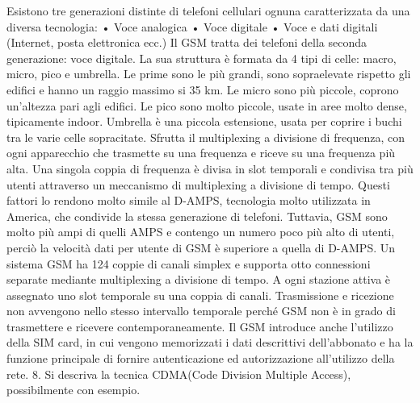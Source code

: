Esistono tre generazioni distinte di telefoni cellulari ognuna caratterizzata da una diversa tecnologia:
•	Voce analogica
•	Voce digitale
•	Voce e dati digitali (Internet, posta elettronica ecc.)
Il GSM tratta dei telefoni della seconda generazione: voce digitale.
La sua struttura è formata da 4 tipi di celle: macro, micro, pico e umbrella. 
Le prime sono le più grandi, sono sopraelevate rispetto gli edifici e hanno un raggio massimo si 35 km. Le micro sono più piccole, coprono un'altezza pari agli edifici. Le pico sono molto piccole, usate in aree molto dense, tipicamente indoor. Umbrella è una piccola estensione, usata per coprire i buchi tra le varie celle sopracitate.
Sfrutta il multiplexing a divisione di frequenza, con ogni apparecchio che trasmette su una frequenza e riceve su una frequenza più alta. Una singola coppia di frequenza è divisa in slot temporali e condivisa tra più utenti attraverso un meccanismo di multiplexing a divisione di tempo.
Questi fattori lo rendono molto simile al D-AMPS, tecnologia molto utilizzata in America, che condivide la stessa generazione di telefoni. Tuttavia, GSM sono molto più ampi di quelli AMPS e contengo un numero poco più alto di utenti, perciò la velocità dati per utente di GSM è superiore a quella di D-AMPS.
Un sistema GSM ha 124 coppie di canali simplex e supporta otto connessioni separate mediante multiplexing a divisione di tempo.
A ogni stazione attiva è assegnato uno slot temporale su una coppia di canali.
Trasmissione e ricezione non avvengono nello stesso intervallo temporale perché GSM non è in grado di trasmettere e ricevere contemporaneamente.
Il GSM introduce anche l’utilizzo della SIM card, in cui vengono memorizzati i dati descrittivi dell’abbonato e ha la funzione principale di fornire autenticazione ed autorizzazione all’utilizzo della rete.
8.	Si descriva la tecnica CDMA(Code Division Multiple Access), possibilmente con esempio.

